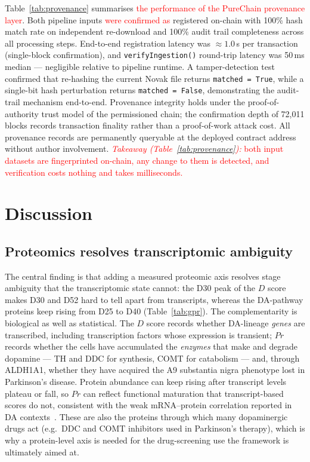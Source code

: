 \documentclass[5p,times,twocolumn]{elsarticle}
\newcommand{\rtag}[1]{}
\newcommand{\rev}[2]{\rtag{#1}\textcolor{red}{#2}}
\newenvironment{revblock}[1]{\par\color{red}\rtag{#1}\ignorespaces}{\par}
\newcommand{\lang}[1]{\textcolor{red}{#1}}
\begin{document}
Table~\ref{tab:provenance} summarises \lang{the performance of the
  PureChain provenance layer}.
Both pipeline inputs \lang{were confirmed as} registered on-chain with
100\% hash match rate on independent re-download and 100\% audit
trail completeness across all processing steps.
End-to-end registration latency was $\approx 1.0$\,s per
transaction (single-block confirmation), and
\texttt{verifyIngestion()} round-trip latency was 50\,ms median
--- negligible relative to pipeline runtime.
A tamper-detection test confirmed that re-hashing the current
Novak file returns \texttt{matched = True}, while a single-bit
hash perturbation returns \texttt{matched = False},
demonstrating the audit-trail mechanism end-to-end.
Provenance integrity holds under the proof-of-authority trust
model of the permissioned chain; the confirmation depth of
72,011 blocks records transaction finality rather than a
proof-of-work attack cost.
All provenance records are permanently queryable at the deployed
contract address without author involvement.
\rev{R1.13}{\textit{Takeaway (Table~\ref{tab:provenance}):} both
  input datasets are fingerprinted on-chain, any change to them is
  detected, and verification costs nothing and takes milliseconds.}

\section{Discussion}

\subsection{\textbf{Proteomics resolves transcriptomic
    ambiguity}}

\begin{revblock}{R1.14,R2.14}
  The central finding is that adding a measured proteomic axis
  resolves stage ambiguity that the transcriptomic state cannot:
  the D30 peak of the $D$ score makes D30 and D52 hard to tell
  apart from transcripts, whereas the DA-pathway proteins keep
  rising from D25 to D40 (Table~\ref{tab:gpr}).
  The complementarity is biological as well as statistical.
  The $D$ score records whether DA-lineage \textit{genes} are
  transcribed, including transcription factors whose expression
  is transient; $Pr$ records whether the cells have accumulated
  the \textit{enzymes} that make and degrade dopamine --- TH and
  DDC for synthesis, COMT for catabolism --- and, through ALDH1A1,
  whether they have acquired the A9 substantia nigra phenotype
  lost in Parkinson's disease. Protein abundance can keep rising
  after transcript levels plateau or fall, so $Pr$ can reflect
  functional maturation that transcript-based scores do not,
  consistent with the weak mRNA--protein correlation reported in
  DA contexts~\cite{novak2022single,cavarischia2024proteome}.
  These are also the proteins through which many
  dopaminergic drugs act (e.g.\ DDC and COMT inhibitors used in
  Parkinson's therapy), which is why a protein-level axis is
  needed for the drug-screening use the framework is ultimately
  aimed at.
\end{revblock}
\end{document}
